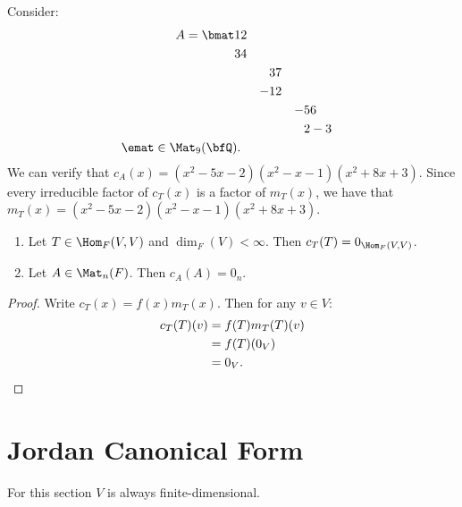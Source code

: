     \begin{example}
        Consider:
            \begin{equation*}
            \begin{split}
                A = 
                \bmat
                1& 2 \\
                3 & 4 \\
                & & 3 & 7 \\
                & & -1 & 2 \\
                & & & & -5 & 6 \\
                & & & & 2 & -3 \\
                \emat \in \Mat_9(\bfQ).
            \end{split}
            \end{equation*}
        We can verify that $c_A(x) = (x^2-5x-2)(x^2-x-1)(x^2+8x+3)$. Since every irreducible factor of $c_T(x)$ is a factor of $m_T(x)$, we have that $m_T(x) = (x^2-5x-2)(x^2-x-1)(x^2+8x+3)$.
    \end{example}

    \begin{theorem}\label{thm:cayley-hamilton}
        \phantom{a}
        \begin{enumerate}[label = (\arabic*)]
            \item Let $T \in \Hom_F(V,V)$ and $\dim_F(V) < \infty$. Then $c_T(T) = 0_{\Hom_F{(V,V)}}$.
            \item Let $A \in \Mat_n(F)$. Then $c_A(A) = 0_n$.
        \end{enumerate}
    \end{theorem}
        \begin{proof}
            Write $c_T(x) = f(x)m_T(x)$. Then for any $v \in V$:
                \begin{equation*}
                \begin{split}
                    c_T(T)(v)
                    & = f(T)m_T(T)(v) \\
                    & = f(T)(0_V) \\
                    & = 0_V.\qedhere
                \end{split}
                \end{equation*}
        \end{proof}

\section{Jordan Canonical Form}
For this section $V$ is always finite-dimensional.

